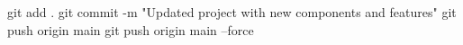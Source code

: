 git add .
git commit -m "Updated project with new components and features"
git push origin main
git push origin main --force
